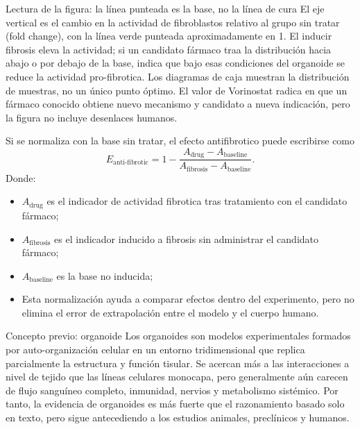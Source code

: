\begin{knowledgebox}{Lectura de la figura: la línea punteada es la base, no la línea de cura}
El eje vertical es el cambio en la actividad de fibroblastos relativo al grupo sin tratar (fold change), con la línea verde punteada aproximadamente en 1. El inducir fibrosis eleva la actividad; si un candidato fármaco traa la distribución hacia abajo o por debajo de la base, indica que bajo esas condiciones del organoide se reduce la actividad pro-fibrotica. Los diagramas de caja muestran la distribución de muestras, no un único punto óptimo. El valor de Vorinostat radica en que un fármaco conocido obtiene nuevo mecanismo y candidato a nueva indicación, pero la figura no incluye desenlaces humanos.
\end{knowledgebox}

Si se normaliza con la base sin tratar, el efecto antifibrotico puede escribirse como
$$
E_{\text{anti-fibrotic}}
=1-\frac{A_{\text{drug}}-A_{\text{baseline}}}
{A_{\text{fibrosis}}-A_{\text{baseline}}}.
$$
Donde:
\begin{itemize}
  \item $A_{\text{drug}}$ es el indicador de actividad fibrotica tras tratamiento con el candidato fármaco;
  \item $A_{\text{fibrosis}}$ es el indicador inducido a fibrosis sin administrar el candidato fármaco;
  \item $A_{\text{baseline}}$ es la base no inducida;
  \item Esta normalización ayuda a comparar efectos dentro del experimento, pero no elimina el error de extrapolación entre el modelo y el cuerpo humano.
\end{itemize}

\begin{knowledgebox}{Concepto previo: organoide}
Los organoides son modelos experimentales formados por auto-organización celular en un entorno tridimensional que replica parcialmente la estructura y función tisular. Se acercan más a las interacciones a nivel de tejido que las líneas celulares monocapa, pero generalmente aún carecen de flujo sanguíneo completo, inmunidad, nervios y metabolismo sistémico. Por tanto, la evidencia de organoides es más fuerte que el razonamiento basado solo en texto, pero sigue antecediendo a los estudios animales, preclínicos y humanos.
\end{knowledgebox}


